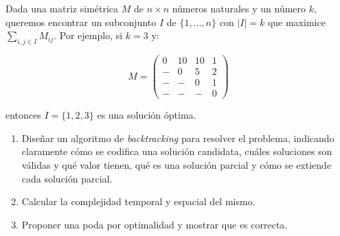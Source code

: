 
\item Dada una matriz simétrica $M$ de $n \times n$ números naturales y un número $k$, queremos encontrar un subconjunto $I$ de $\{1, \ldots, n\}$ con $|I| = k$ que maximice $\sum_{i,j \in I} M_{ij}$.  Por ejemplo, si $k = 3$ y:


\[
    M = \begin{pmatrix}
          0 & 10 & 10 & 1 \\
          - &  0 &  5 & 2 \\
          - &  - &  0 & 1 \\
          - &  - &  - & 0
        \end{pmatrix}
\]


entonces $I = \{1,2,3\}$ es una solución óptima.


\begin{enumerate}
 \item Diseñar un algoritmo de \emph{backtracking} para resolver el problema, indicando claramente cómo se codifica una solución candidata, cuáles soluciones son válidas y qué valor tienen, qué es una solución parcial y cómo se extiende cada solución parcial.
 \item Calcular la complejidad temporal y espacial del mismo.
 \item Proponer una poda por optimalidad y mostrar que es correcta.
\end{enumerate}


